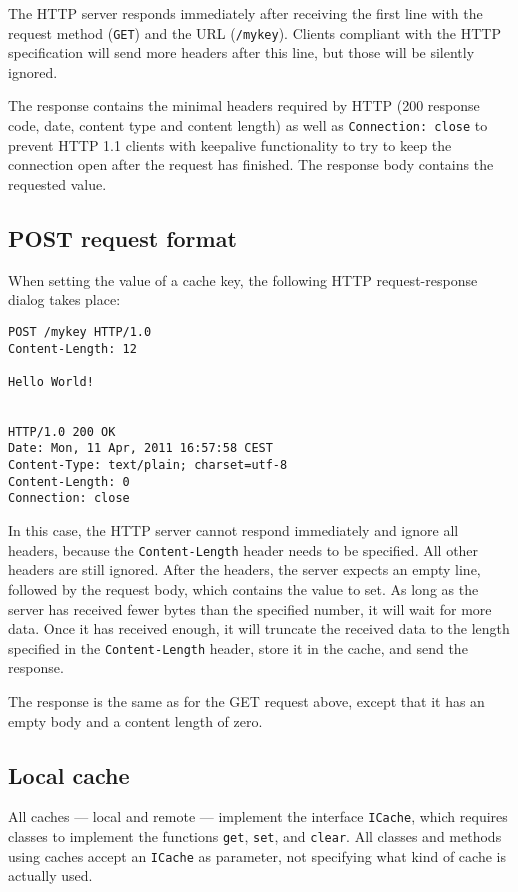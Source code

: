 \documentclass[11pt]{article}
\begin{document}
The HTTP server responds immediately after receiving the first line with the
request method (\lstinline!GET!) and the URL (\lstinline!/mykey!). Clients
compliant with the HTTP specification will send more headers after this line,
but those will be silently ignored.

The response contains the minimal headers required by HTTP (200 response code,
date, content type and content length) as well as \lstinline!Connection: close!
to prevent HTTP 1.1 clients with keepalive functionality to try to keep the
connection open after the request has finished. The response body contains
the requested value.

\subsection*{POST request format}
When setting the value of a cache key, the following HTTP request-response
dialog takes place:

\begin{lstlisting}
POST /mykey HTTP/1.0
Content-Length: 12

Hello World!


HTTP/1.0 200 OK
Date: Mon, 11 Apr, 2011 16:57:58 CEST
Content-Type: text/plain; charset=utf-8
Content-Length: 0
Connection: close
\end{lstlisting}

In this case, the HTTP server cannot respond immediately and ignore all headers,
because the \lstinline!Content-Length! header needs to be specified. All other
headers are still ignored. After the headers, the server expects an empty line,
followed by the request body, which contains the value to set. As long as the
server has received fewer bytes than the specified number, it will wait for
more data. Once it has received enough, it will truncate the received data
to the length specified in the \lstinline!Content-Length! header, store it
in the cache, and send the response.

The response is the same as for the GET request above, except that it has an
empty body and a content length of zero.

\subsection*{Local cache}
All caches --- local and remote --- implement the interface \texttt{ICache}, which requires classes to implement the functions \texttt{get}, \texttt{set}, and \texttt{clear}. All classes and methods using caches accept an \texttt{ICache} as parameter, not specifying what kind of cache is actually used.
\end{document}
